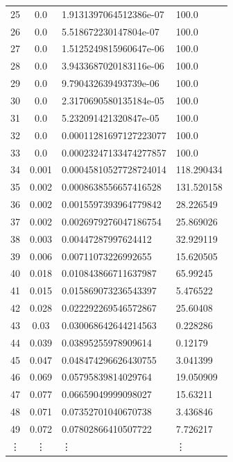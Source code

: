 \documentclass[11pt]{extarticle}
\begin{document}
\begin{enumerate}[(a)]
\begin{table}[ht!]
\begin{minipage}{0.5\textwidth}
\begin{tabular}{ccll}
25  &  0.0  &  1.9131397064512386e-07  &  100.0 \\
26  &  0.0  &  5.518672230147804e-07  &  100.0 \\
27  &  0.0  &  1.5125249815960647e-06  &  100.0 \\
28  &  0.0  &  3.9433687020183116e-06  &  100.0 \\
29  &  0.0  &  9.790432639493739e-06  &  100.0 \\
30  &  0.0  &  2.3170690580135184e-05  &  100.0 \\
31  &  0.0  &  5.232091421320847e-05  &  100.0 \\
32  &  0.0  &  0.00011281697127223077  &  100.0 \\
33  &  0.0  &  0.00023247133474277857  &  100.0 \\
34  &  0.001  &  0.00045810527728724014  &  118.290434 \\
35  &  0.002  &  0.0008638556657416528  &  131.520158 \\
36  &  0.002  &  0.0015597393964779842  &  28.226549 \\
37  &  0.002  &  0.0026979276047186754  &  25.869026 \\
38  &  0.003  &  0.00447287997624412  &  32.929119 \\
39  &  0.006  &  0.00711073226992655  &  15.620505 \\
40  &  0.018  &  0.010843866711637987  &  65.99245 \\
41  &  0.015  &  0.015869073236543397  &  5.476522 \\
42  &  0.028  &  0.022292269546572867  &  25.60408 \\
43  &  0.03  &  0.030068642644214563  &  0.228286 \\
44  &  0.039  &  0.03895255978909614  &  0.12179 \\
45  &  0.047  &  0.048474296626430755  &  3.041399 \\
46  &  0.069  &  0.05795839814029764  &  19.050909 \\
47  &  0.077  &  0.06659049999098027  &  15.63211 \\
48  &  0.071  &  0.07352701040670738  &  3.436846 \\
49  &  0.072  &  0.07802866410507722  &  7.726217 \\
\vdots & \vdots & \vdots & \vdots \\
\toprule
\end{tabular}

\end{minipage} \hfill
\begin{minipage}{0.5\textwidth}


\end{minipage}
\end{table}
\end{enumerate}
\end{document}
